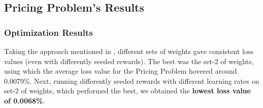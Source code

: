 \documentclass[12pt]{article}
\begin{document}
    \subsection{Pricing Problem's Results} \label{sec:Pricing Problem's Results}
    \subsubsection{Optimization Results} \label{sec:PriProbRes - Optimization}
    Taking the approach mentioned in , different sets of weights gave consistent loss values (even with differently seeded rewards). The best was the set-2 of weights, using which the average loss value for the Pricing Problem hovered around 0.0079\%. Next, running differently seeded rewards with different learning rates on set-2 of weights, which performed the best, we obtained the \textbf{lowest loss value of 0.0068\%}.
\end{document}
